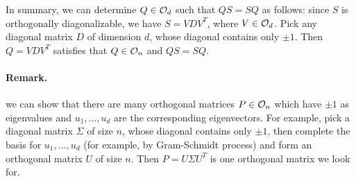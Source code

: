 In summary, we can determine $Q \in \mathcal O_d$ such that $QS = SQ$ as follows: since $S$ is orthogonally diagonalizable,
we have $S = V D V^T$, where $V \in \mathcal O_d$. Pick any diagonal matrix $D$ of dimension $d$, whose
diagonal contains only $\pm 1$. Then $Q = V D V^T$ satisfies that $Q \in \mathcal O_n$ and $QS = SQ$.

\paragraph*{Remark.} we can show that there are many orthogonal matrices $P \in \mathcal O_n$ which have $\pm 1$ as eigenvalues and
$u_1, \dots, u_d$ are the corresponding eigenvectors. For example, pick a diagonal matrix $\Sigma$ of size $n$,
whose diagonal contains only $\pm 1$, then complete the basis for $u_1, ..., u_d$
(for example, by Gram-Schmidt process) and form an orthogonal matrix $U$ of size $n$.
Then $P = U \Sigma U^T$ is one orthogonal matrix we look for.


